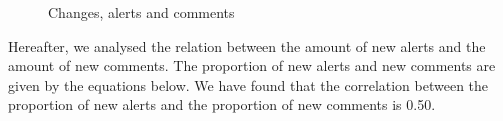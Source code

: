 \documentclass[
]{article}
\begin{document}
\begin{figure}
    \centering
    \caption{\label{timeseries}Changes, alerts and comments}
\end{figure}

Hereafter, we analysed the relation between the amount of new alerts and the amount of new comments. The proportion of new alerts and new comments are given by the equations below. We have found that the correlation between the proportion of new alerts and the proportion of new comments is 0.50.
\end{document}
